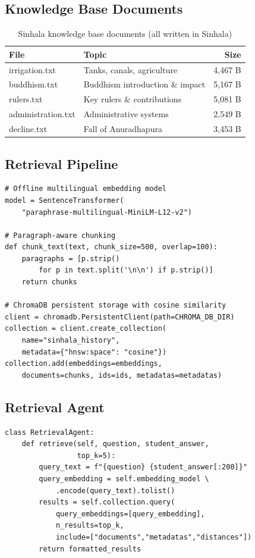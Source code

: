 \documentclass[12pt,a4paper]{article}
\begin{document}
\subsection{Knowledge Base Documents}
\begin{table}[H]
\centering
\begin{tabular}{llr}
\toprule
\textbf{File} & \textbf{Topic} & \textbf{Size} \\
\midrule
irrigation.txt & Tanks, canals, agriculture & 4,467 B \\
buddhism.txt & Buddhism introduction \& impact & 5,167 B \\
rulers.txt & Key rulers \& contributions & 5,081 B \\
administration.txt & Administrative systems & 2,549 B \\
decline.txt & Fall of Anuradhapura & 3,453 B \\
\bottomrule
\end{tabular}
\caption{Sinhala knowledge base documents (all written in Sinhala)}
\end{table}

\subsection{Retrieval Pipeline}
\begin{lstlisting}[caption={Knowledge base setup (setup\_kb.py)}]
# Offline multilingual embedding model
model = SentenceTransformer(
    "paraphrase-multilingual-MiniLM-L12-v2")

# Paragraph-aware chunking
def chunk_text(text, chunk_size=500, overlap=100):
    paragraphs = [p.strip()
        for p in text.split('\n\n') if p.strip()]
    return chunks

# ChromaDB persistent storage with cosine similarity
client = chromadb.PersistentClient(path=CHROMA_DB_DIR)
collection = client.create_collection(
    name="sinhala_history",
    metadata={"hnsw:space": "cosine"})
collection.add(embeddings=embeddings,
    documents=chunks, ids=ids, metadatas=metadatas)
\end{lstlisting}

\subsection{Retrieval Agent}
\begin{lstlisting}[caption={Retrieval Agent (retrieval\_agent.py)}]
class RetrievalAgent:
    def retrieve(self, question, student_answer,
                 top_k=5):
        query_text = f"{question} {student_answer[:200]}"
        query_embedding = self.embedding_model \
            .encode(query_text).tolist()
        results = self.collection.query(
            query_embeddings=[query_embedding],
            n_results=top_k,
            include=["documents","metadatas","distances"])
        return formatted_results
\end{lstlisting}
\end{document}
